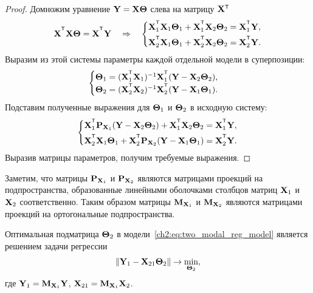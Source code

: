 \begin{proof}
	Домножим уравнение $\mathbf{Y} = \mathbf{X} \boldsymbol{\Theta}$ слева на матрицу $\bX{\T}$
	\[
		\bX^{\T} \bX \bTheta = \bX^{\T} \bY \quad \Rightarrow \quad
		\begin{cases*}
			\bX_1^{\T} \bX_1 \bTheta_1 + \bX_1^{\T} \bX_2 \bTheta_2 = \bX_1^{\T} \bY, \\
			\bX_2^{\T} \bX_1 \bTheta_1 + \bX_2^{\T} \bX_2 \bTheta_2 = \bX_2^{\T} \bY.
		\end{cases*}
	\]
	Выразим из этой системы параметры каждой отдельной модели в суперпозиции:
	\[
		\begin{cases}
			\bTheta_1 = (\bX_1^{\T} \bX_1)^{-1} \bX_1^{\T} (\bY - \bX_2 \bTheta_2), \\
			\bTheta_2 = (\bX_2^{\T} \bX_2 )^{-1}  \bX_2^{\T} (\bY - \bX_1 \bTheta_1).
		\end{cases}
	\]
	Подставим полученные выражения для $\boldsymbol{\Theta}_1$ и $\boldsymbol{\Theta}_2$ в исходную систему:
	\[
				\begin{cases*}
					\bX_1^{\T} \bP_{\bX_1} (\bY - \bX_2 \bTheta_2) + \bX_1^{\T} \bX_2 \bTheta_2 = \bX_1^{\T} \bY, \\
					\bX_2^{\T} \bX_1 \bTheta_1 + \bX_2^{\T}\bP_{\bX_2} (\bY - \bX_1 \bTheta_1) = \bX_2^{\T} \bY.
				\end{cases*}
	\]
	Выразив матрицы параметров, получим требуемые выражения.
\end{proof}

Заметим, что матрицы $\mathbf{P}_{\mathbf{X}_1}$ и $\mathbf{P}_{\mathbf{X}_2}$ являются матрицами проекций на подпространства, образованные линейными оболочками столбцов матриц $\mathbf{X}_1$ и $\mathbf{X}_2$ соответственно.
Таким образом матрицы $\mathbf{M}_{\mathbf{X}_1}$ и $\mathbf{M}_{\mathbf{X}_2}$ являются матрицами проекций на ортогональные подпространства.

\begin{statement}
	\label{ch2:stat:two_modal_theta2}
	Оптимальная подматрица $\boldsymbol{\Theta}_2$ в модели~\eqref{ch2:eq:two_modal_reg_model} является решением задачи регрессии
	\begin{equation}
		\| \mathbf{Y}_1 -  \mathbf{X}_{21} \boldsymbol{\Theta}_2 \| \rightarrow \min_{\boldsymbol{\Theta}_2},
		\label{ch2:eq:two_modal_fwl}
	\end{equation}
	где $\mathbf{Y}_1 = \mathbf{M}_{\mathbf{X}_1} \mathbf{Y}$, $\mathbf{X}_{21} = \mathbf{M}_{\mathbf{X}_1} \mathbf{X}_2$.
\end{statement}

